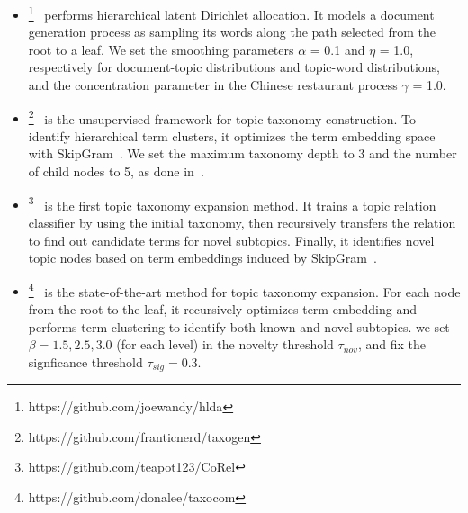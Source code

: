 \begin{itemize}
    \item \textbf{\hlda}\footnote{https://github.com/joewandy/hlda}~\cite{blei2003hierarchical} performs hierarchical latent Dirichlet allocation.
    It models a document generation process as sampling its words along the path selected from the root to a leaf. 
    We set the smoothing parameters $\alpha$ = 0.1 and $\eta$ = 1.0, respectively for document-topic distributions and topic-word distributions, and the concentration parameter in the Chinese restaurant process $\gamma$ = 1.0. 
    
    \item \textbf{\taxogen}\footnote{https://github.com/franticnerd/taxogen}~\cite{zhang2018taxogen} is the unsupervised framework for topic taxonomy construction. 
    To identify hierarchical term clusters, it optimizes the term embedding space with SkipGram~\cite{mikolov2013distributed}.
    We set the maximum taxonomy depth to 3 and the number of child nodes to 5, as done in~\cite{zhang2018taxogen,shang2020nettaxo}.
    
    \item \textbf{\corel}\footnote{https://github.com/teapot123/CoRel}~\cite{huang2020corel} is the first topic taxonomy expansion method.
    It trains a topic relation classifier by using the initial taxonomy, then recursively transfers the relation to find out candidate terms for novel subtopics. 
    Finally, it identifies novel topic nodes based on term embeddings induced by SkipGram~\cite{mikolov2013distributed}.
    
    \item \textbf{\taxocom}\footnote{https://github.com/donalee/taxocom}~\cite{lee2022taxocom} is the state-of-the-art method for topic taxonomy expansion. 
    For each node from the root to the leaf, it recursively optimizes term embedding and performs term clustering to identify both known and novel subtopics.
    we set $\beta=1.5, 2.5, 3.0$ (for each level) in the novelty threshold $\tau_{nov}$, and fix the signficance threshold $\tau_{sig}=0.3$.
    
\end{itemize}

